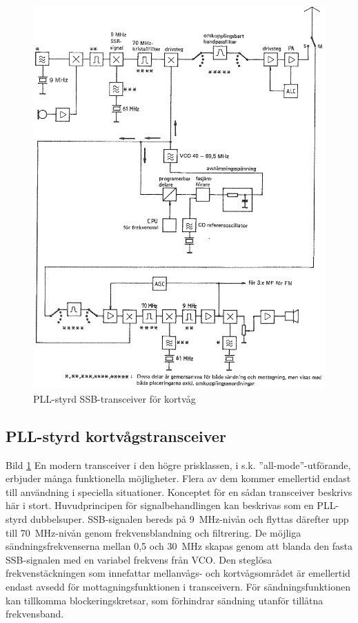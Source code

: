 \begin{figure}
  \includegraphics[width=\textwidth]{images/bild_2_5-15.png}
  \caption{PLL-styrd SSB-transceiver för kortvåg}
  \label{fig:bildII5-15}
\end{figure}

\subsection{PLL-styrd kortvågstransceiver}

Bild \ref{fig:bildII5-15} En modern transceiver i den högre prisklassen, i
s.k. ''all-mode''-utförande, erbjuder många funktionella
möjligheter. Flera av dem kommer emellertid endast till användning i
speciella situationer. Konceptet för en sådan transceiver beskrivs här
i stort. Huvudprincipen för signalbehandlingen kan beskrivas som en
PLL-styrd dubbelsuper. SSB-signalen bereds på 9~MHz-nivån och flyttas
därefter upp till 70~MHz-nivån genom frekvensblandning och
filtrering. De möjliga sändningsfrekvenserna mellan 0,5 och 30~MHz
skapas genom att blanda den fasta SSB-signalen med en variabel
frekvens från VCO. Den steglösa frekvenstäckningen som innefattar
mellanvågs- och kortvågsområdet är emellertid endast avsedd för
mottagningsfunktionen i transceivern. För sändningsfunktionen kan
tillkomma blockeringskretsar, som förhindrar sändning utanför tillåtna
frekvensband.

